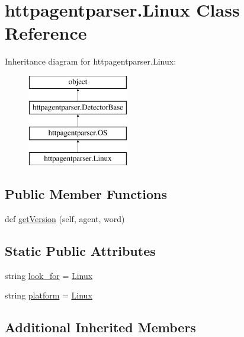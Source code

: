 \hypertarget{classhttpagentparser_1_1_linux}{}\section{httpagentparser.\+Linux Class Reference}
\label{classhttpagentparser_1_1_linux}
Inheritance diagram for httpagentparser.\+Linux\+:\begin{figure}[H]
\begin{center}
\leavevmode
\includegraphics[height=4.000000cm]{classhttpagentparser_1_1_linux}
\end{center}
\end{figure}
\subsection*{Public Member Functions}
\begin{DoxyCompactItemize}
\item 
def \hyperlink{classhttpagentparser_1_1_linux_a17c934ca567c661e411c3e9262400430}{get\+Version} (self, agent, word)
\end{DoxyCompactItemize}
\subsection*{Static Public Attributes}
\begin{DoxyCompactItemize}
\item 
string \hyperlink{classhttpagentparser_1_1_linux_a5a5485ce77649a86125d36ef00e02da7}{look\+\_\+for} = \textquotesingle{}\hyperlink{classhttpagentparser_1_1_linux}{Linux}\textquotesingle{}
\item 
string \hyperlink{classhttpagentparser_1_1_linux_a0f50a845c2d886f1c31c31f03571d293}{platform} = \textquotesingle{}\hyperlink{classhttpagentparser_1_1_linux}{Linux}\textquotesingle{}
\end{DoxyCompactItemize}
\subsection*{Additional Inherited Members}


